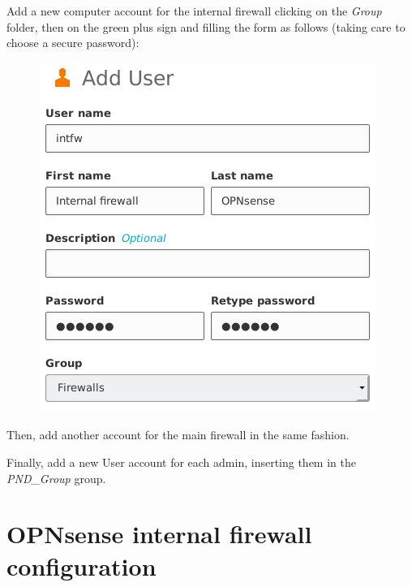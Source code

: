 \documentclass[draft]{homework}
\newcommand{\opn}{OPNsense\xspace}
\begin{document}
    Add a new computer account for the internal firewall clicking on the \textit{Group} folder, then on the green plus sign and filling the form as follows (taking care to choose a secure password):
    \begin{figure}[H]
        \centering
        \includegraphics[width=\linewidth]{images/intfw}
        \label{fig:group}
    \end{figure}
    \noindent Then, add another account for the main firewall in the same fashion.
    
    Finally, add a new User account for each admin, inserting them in the \textit{PND\_Group} group.
    
    
    \section{\opn internal firewall configuration}
\end{document}
